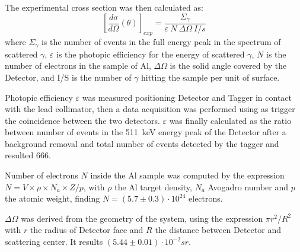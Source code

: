 The experimental cross section was then calculated as:
\begin{equation*}
	\left[\frac{d\sigma}{d\Omega}(\theta)\right]_{exp}=\frac{\Sigma_\gamma}{\varepsilon\ N\ \Delta\Omega\ I/s}
\end{equation*}
 where $\Sigma_\gamma$ is the number of events in the full energy peak in the spectrum of scattered $\gamma$, $\varepsilon$ is the photopic efficiency for the energy of scattered  $\gamma$, $N$ is the number of electrons in the sample of Al, $\Delta\Omega$ is the solid angle covered by the Detector, and I/S is the number of $\gamma$ hitting the sample per unit of surface. 
 
 Photopic efficiency $\varepsilon$ was measured positioning Detector and Tagger in contact with the lead collimator, then a data acquisition was performed using as trigger the coincidence between the two detectors.
 $\varepsilon$ was finally calculated as the ratio between number of events in the 511~keV energy peak of the Detector after a background removal and total number of events detected by the tagger and resulted 666.
 
 Number of electrons $N$ inside the Al sample was computed by the expression $N=V\times \rho\times N_a\times Z/p$, with $\rho$ the Al target density, $N_a$ Avogadro number and $p$  the atomic weight, finding $N=(5.7 \pm 0.3)\cdot10^{24}$ electrons.
 
  $\Delta\Omega$ was derived from the geometry of the system, using the expression $\pi r^2/R^2$ with $r$ the radius of Detector face and $R$ the distance between Detector and scattering center. It results $(5.44\pm0.01)\cdot 10^{-2} sr$.
 
